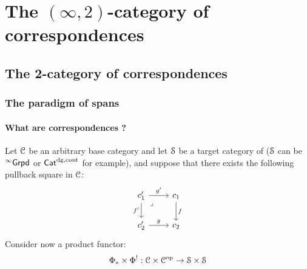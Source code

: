 \chapter{The \texorpdfstring{$(\infty, 2)$}{}-category of correspondences}
    \begin{abstract}
        
    \end{abstract}
    
    \minitoc

    \section{The 2-category of correspondences}
        \subsection{The paradigm of spans}
            \subsubsection{What are correspondences ?}
                \begin{remark} \label{remark: why_correspondences}
                    Let $\C$ be an arbitrary base category and let $\S$ be a target category of  ($\S$ can be ${}^{\infty}\Grpd$ or $\Cat^{\dg, \cont}$ for example), and suppose that there exists the following pullback square in $\C$:
                        $$
                            \begin{tikzcd}
                            	{c_1'} & {c_1} \\
                            	{c_2'} & {c_2}
                            	\arrow["f", from=1-2, to=2-2]
                            	\arrow["g", from=2-1, to=2-2]
                            	\arrow["{f'}"', from=1-1, to=2-1]
                            	\arrow["{g'}", from=1-1, to=1-2]
                            	\arrow["\lrcorner"{anchor=center, pos=0.125}, draw=none, from=1-1, to=2-2]
                            \end{tikzcd}
                        $$
                    Consider now a product functor:
                        $$\Phi_* \x \Phi^!: \C \x \C^{\op} \to \S \x \S$$
                    
                \end{remark}
            
